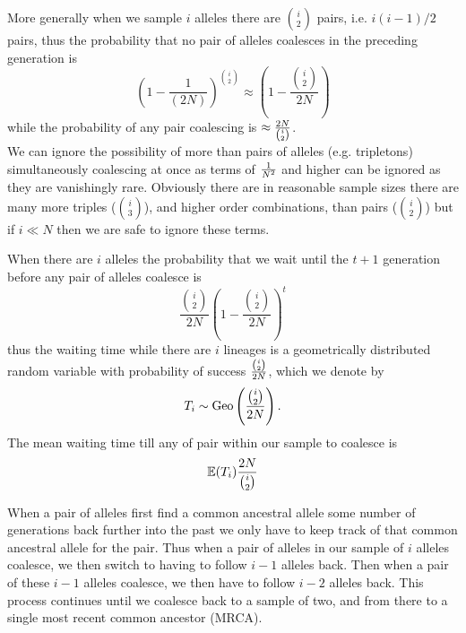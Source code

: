 More generally when we sample $i$ alleles there are ${i \choose 2}$
pairs,  i.e. $i(i-1)/2$ pairs, thus the probability that no pair
of alleles coalesces in the preceding generation is
\begin{equation}
\left(1-\frac{1}{(2N)} \right)^{{i \choose
 2}} \approx \left( 1- \frac{{i \choose
 2}}{2N}\right)
\end{equation}
while the probability of any pair coalescing is $\approx \nicefrac{2N}{{i \choose
 2}}$.\\

We can ignore the possibility of more than pairs of alleles (e.g. tripletons)
simultaneously coalescing at once as terms of $\nicefrac{1}{N^2}$ and higher
can be ignored as they are vanishingly rare. Obviously there are in reasonable
sample sizes there are many more triples (${i \choose 3}$), and higher order
combinations, than pairs (${i \choose 2}$) but if $i \ll N$ then we are safe to
ignore these terms.


When there are $i$ alleles the probability that we wait until the
$t+1$ generation before
any pair of alleles coalesce is
\begin{equation}
 \frac{{i \choose
 2}}{2N}\left( 1- \frac{{i \choose
 2}}{2N}\right)^{t} \label{eqn:T_i}
\end{equation}
thus the waiting time while there are $i$ lineages is a geometrically
distributed random variable with probability of success $ \nicefrac{{i \choose
    2}}{2N}$, which we denote by
\begin{equation}
T_i \sim \text{Geo}
\left(  \nicefrac{{i \choose
      2}}{2N} \right).
\end{equation}
The mean waiting time till any of pair within our
 sample to coalesce is 
\begin{equation}
\E( T_i) \frac{2N}{{i \choose  2}}  \label{eqn:E_T_i}
\end{equation}

When a pair of alleles first find a common ancestral allele some
number of generations back further into the past we only have to keep
track of that common ancestral allele for the pair. Thus when a pair
of alleles in our sample of $i$ alleles coalesce, we then switch to
having to follow $i-1$ alleles back. Then when a pair of these $i-1$
alleles coalesce, we then have to follow $i-2$ alleles back. This
process continues until we coalesce back to a sample of two, and from
there to a single most recent common ancestor (MRCA).\\


